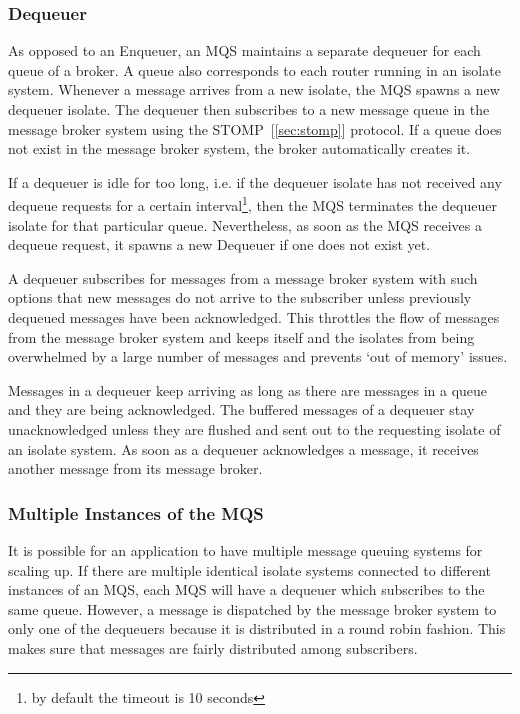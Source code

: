   \subsubsection{Dequeuer}
  As opposed to an Enqueuer, an MQS maintains a separate dequeuer for each queue of a broker. A queue also corresponds to each router running in an isolate system. Whenever a message arrives from a new isolate, the MQS spawns a new dequeuer isolate. The dequeuer then subscribes to a new message queue in the message broker system using the STOMP~[\ref{sec:stomp}] protocol. If a queue does not exist in the message broker system, the broker automatically creates it.

  If a dequeuer is idle for too long, i.e. if the dequeuer isolate has not received any dequeue requests for a certain interval\footnote{by default the timeout is 10 seconds}, then the MQS terminates the dequeuer isolate for that particular queue. Nevertheless, as soon as the MQS receives a dequeue request, it spawns a new Dequeuer if one does not exist yet.

  A dequeuer subscribes for messages from a message broker system with such options that new messages do not arrive to the subscriber unless previously dequeued messages have been acknowledged. This throttles the flow of messages from the message broker system and keeps itself and the isolates from being overwhelmed by a large number of messages and prevents ‘out of memory’ issues.

  Messages in a dequeuer keep arriving as long as there are messages in a queue and they are being acknowledged. The buffered messages of a dequeuer stay unacknowledged unless they are flushed and sent out to the requesting isolate of an isolate system. As soon as a dequeuer acknowledges a message, it receives another message from its message broker.

  \subsubsection{Multiple Instances of the MQS}
  It is possible for an application to have multiple message queuing systems for scaling up. If there are multiple identical isolate systems connected to different instances of an MQS, each MQS will have a dequeuer which subscribes to the same queue. However, a message is dispatched by the message broker system to only one of the dequeuers because it is distributed in a round robin fashion. This makes sure that messages are fairly distributed among subscribers.

